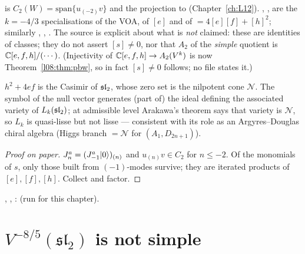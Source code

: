 \begin{dictionary}
 is $C_2(W) = \mathrm{span}\{u_{(-2)}v\}$ and  the projection to
 (Chapter~\ref{ch:L12}). , ,  are the $k=-4/3$
specialisations of the VOA, of $[e]$ and of  $=4[e][f]+[h]^2$; similarly ,
, . The source is explicit about what is \emph{not} claimed: these are
identities of classes; they do not assert $[s]\ne0$, nor that $A_2$ of the \emph{simple} quotient is
${\mathbb{C}}[e,f,h]/(\cdots)$. (Injectivity of ${\mathbb{C}}[e,f,h]\to A_2(V^k)$ is now Theorem~\ref{l08:thm:pbw}, so in
fact $[s]\ne0$ follows; no file states it.)
\end{dictionary}

\begin{physics}
$h^2+4ef$ is the Casimir of $\mathfrak{sl}_2$, whose zero set is the nilpotent cone $\mathcal N$. The symbol of
the null vector generates (part of) the ideal defining the associated variety of $L_k(\mathfrak{sl}_2)$; at
admissible level Arakawa's theorem says that variety is $\mathcal N$, so $L_k$ is quasi-lisse but not
lisse --- consistent with its role as an Argyres--Douglas chiral algebra (Higgs branch $=\mathcal N$
for $(A_1,D_{2n+1})$).
\end{physics}

\begin{proof}[Proof on paper]
$J^a_n = (J^a_{-1}|0\rangle)_{(n)}$ and $u_{(n)}v\in C_2$ for $n\le-2$. Of the monomials of $s$, only those
built from $(-1)$-modes survive; they are iterated products of $[e],[f],[h]$. Collect and factor.
\end{proof}

\begin{status}
, \allowbreak{}\allowbreak{}\allowbreak{}\allowbreak{},
\allowbreak{}\allowbreak{}\allowbreak{}\allowbreak{}\allowbreak{}: \lean{[propext, Classical.}\allowbreak{}\allowbreak\lean{sound]}
(run for this chapter).
\end{status}

\section{\texorpdfstring{$V^{-8/5}(\mathfrak{sl}_2)$}{V\^{}(-8/5)(sl2)} is not simple}\label{l08:sec:notsimple}

